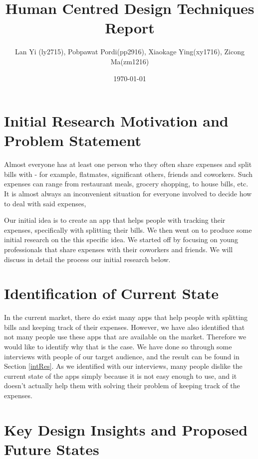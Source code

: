 \documentclass[a4wide, 11pt]{article}
\begin{document}
\title{Human Centred Design Techniques Report}

\author{Lan Yi (ly2715), Pobpawat Pordi(pp2916), Xiaokage Ying(xy1716), Zicong Ma(zm1216)}

\date{\today}         %

\maketitle            %

\section{Initial Research Motivation and Problem Statement} 

Almost everyone has at least one person who they often share expenses and split bills with - for example, flatmates, significant others, friends and coworkers. Such expenses can range from restaurant meals, grocery shopping, to house bills, etc. It is almost always an inconvenient situation for everyone involved to decide how to deal with said expenses,

Our initial idea is to create an app that helps people with tracking their expenses, specifically with splitting their bills. We then went on to produce some initial research on the this specific idea. We started off by focusing on young professionals that share expenses with their coworkers and friends. We will discuss in detail the process our initial research below.

\section{Identification of Current State}

In the current market, there do exist many apps that help people with splitting bills and keeping track of their expenses. However, we have also identified that not many people use these apps that are available on the market. Therefore we would like to identify why that is the case. We have done so through some interviews with people of our target audience, and the result can be found in Section \ref{intRes}. As we identified with our interviews, many people dislike the current state of the apps simply because it is not easy enough to use, and it doesn't actually help them with solving their problem of keeping track of the expenses.

\section{Key Design Insights and Proposed Future States}
\end{document}
